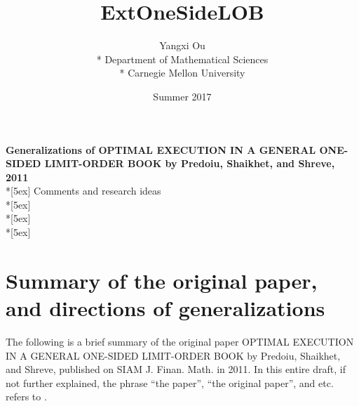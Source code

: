 \documentclass[openany,oneside]{article}
\title{ExtOneSideLOB}
\author{Yangxi Ou \\* Department of Mathematical Sciences \\* Carnegie Mellon University}
\date{Summer 2017}
\theoremstyle{definition}
\theoremstyle{remark}
\begin{document}
\begin{center}	
	\textbf{\Large Generalizations of OPTIMAL EXECUTION IN A GENERAL ONE-SIDED LIMIT-ORDER BOOK by Predoiu, Shaikhet, and Shreve, 2011} \\*[5ex]    
    Comments and research ideas \\*[5ex]
	\theauthor \\*[5ex]
    \thedate \\*[5ex]
	\tableofcontents
\end{center}


\section*{Summary of the original paper, and directions of generalizations}
The following is a brief summary of the original paper OPTIMAL EXECUTION IN A GENERAL ONE-SIDED LIMIT-ORDER BOOK by Predoiu, Shaikhet, and Shreve, published on SIAM J. Finan. Math. in 2011\citep{predoiu2011optimal}. In this entire draft, if not further explained, the phrase ``the paper'', ``the original paper'', and etc. refers to \citet{predoiu2011optimal}.
\end{document}
